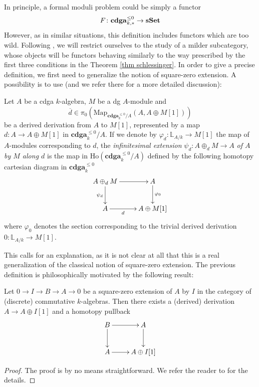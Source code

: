 \begin{refsection}
In principle, a formal moduli problem could be simply a functor
\[
F \colon \mathbf{cdga}_{k,*}^{\le 0} \to \mathbf{sSet}
\]
However, as in similar situations, this definition includes functors which are too wild. Following \cite{dagx}, we will restrict ourselves to the study of a milder subcategory, whose objects will be functors behaving similarly to the way prescribed by the first three conditions in the Theorem \ref{thm schlessinger}. In order to give a precise definition, we first need to generalize the notion of square-zero extension. A possibility is to use \cite[Definition 1.1]{infinitesimalextension} (and we refer there for a more detailed discussion):

\begin{defin}\label{def inf}
Let $A$ be a cdga $k$-algebra, $M$ be a dg $A$-module and
\[
\overline{d} \in \pi_0 (\mathrm{Map}_{\mathbf{cdga}_k^{\le 0}/A} (A, A\oplus M[1]))
\]
be a derived derivation from $A$ to $M[1]$, represented by a map $d \colon A \to A \oplus M[1]$ in $\mathbf{cdga}_k^{\le 0} / A$. If we denote by $\varphi_{d}: \mathbb{L}_{A/k}\to M[1]$ the map of $A$-modules corresponding to $d$, the \emph{infinitesimal extension} $\psi_{d}: A \oplus_{d} M \to A$ \emph{of $A$ by $M$ along $d$} is the map in $\mathrm{Ho}(\mathbf{cdga}_k^{\le 0} / A)$ defined by the following homotopy cartesian diagram in $\mathbf{cdga}_k^{\le 0}$
\[
\xymatrix{A \oplus_{d} M \ar[d]_-{\psi_{d}} \ar[r] & A \ar[d]^-{\varphi_0} \\ A \ar[r]_-{d} & A \oplus M[1] }
\]
where $\varphi_0$ denotes the section corresponding to the trivial derived derivation $0 \colon \mathbb L_{A/k} \to M[1]$.
\end{defin}

This calls for an explanation, as it is not clear at all that this is a real generalization of the classical notion of square-zero extension. The previous definition is philosophically motivated by the following result:

\begin{prop}
Let $0 \to I \to B \to A \to 0$ be a square-zero extension of $A$ by $I$ in the category of (discrete) commutative $k$-algebras. Then there exists a (derived) derivation $A \to A \oplus I[1]$ and a homotopy pullback
\[
\xymatrix{
B \ar[r] \ar[d] & A \ar[d] \\ A \ar[r] & A \oplus I[1]
}
\]
\end{prop}

\begin{proof}
The proof is by no means straightforward. We refer the reader to \cite[Theorem 3.1]{infinitesimalextension} for the details.
\end{proof}


\end{refsection}
